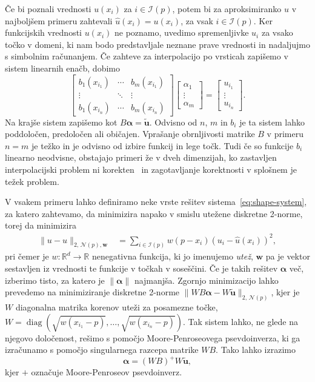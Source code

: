\documentclass[12pt,a4paper,twoside]{article}
\theoremstyle{definition} %
\theoremstyle{plain} %
\numberwithin{equation}{section}
\newcommand{\R}{\mathbb R}
\newcommand{\Nc}{\mathcal{N}}
\newcommand{\I}{\mathcal{I}}
\renewcommand{\b}{\boldsymbol}
\newcommand{\uh}{\hat{u}}
\DeclareMathOperator{\diag}{diag}
\begin{document}
Če bi poznali vrednosti $u(x_i)$ za $i \in \I(p)$, potem bi za aproksimiranko
$\uh$ v najboljšem primeru zahtevali  $\hat{u}(x_i) = u(x_i)$, za vsak $i \in \I(p)$.
Ker funkcijskih vrednosti $u(x_i)$ ne poznamo, uvedimo spremenljivke $u_i$ za vsako točko v domeni,
ki nam bodo predstavljale neznane prave vrednosti in nadaljujmo s simbolnim računanjem.
Če zahteve za interpolacijo po vrsticah zapišemo v sistem linearnih enačb, dobimo
\begin{equation}
\begin{bmatrix}
  b_1(x_{i_1}) & \cdots & b_m(x_{i_1}) \\
  \vdots & \ddots & \vdots   \\
  b_1(x_{i_n}) & \cdots & b_m(x_{i_n})
\end{bmatrix}
\begin{bmatrix}
  \alpha_1 \\ \vdots \\ \alpha_m
\end{bmatrix}
=
\begin{bmatrix}
  u_{i_1} \\ \vdots \\ u_{i_n}
\end{bmatrix}.
  \label{eq:shape-system}
\end{equation}
Na krajše sistem zapišemo kot $B\b{\alpha} = \b{\tilde{u}}$. Odvisno od $n$, $m$ in $b_i$ je ta
sistem lahko poddoločen, predoločen ali običajen. Vprašanje obrnljivosti matrike $B$ v primeru $n=m$
je težko in je odvisno od izbire funkcij in lege točk. Tudi če so funkcije $b_i$ linearno neodvisne,
obstajajo primeri že v dveh dimenzijah, ko zastavljen interpolacijski problem ni
korekten~\cite[str.\ 79, izrek 2.2]{kozak2008numericna} in zagotavljanje korektnosti v splošnem je
težek problem.

V vsakem primeru lahko definiramo neke vrste rešitev sistema~\eqref{eq:shape-system},
za katero zahtevamo, da minimizira napako v smislu utežene diskretne 2-norme, torej da minimizira
\begin{align}
  \|u-\uh\|_{2, \,\Nc(p), \b{w}} &= \sum_{i\in \I(p)} w(p-x_i) (u_i - \uh(x_i))^2,
\end{align}
pri čemer je $w\colon\R^d\to\R$ nenegativna funkcija, ki jo imenujemo \emph{utež}, $\b{w}$ pa je
vektor sestavljen iz vrednosti te funkcije v točkah v soseščini. Če je takih rešitev $\b \alpha$ več,
izberimo tisto, za katero je $\|\b\alpha\|$ najmanjša. Zgornjo minimizacijo lahko prevedemo na
minimiziranje diskretne 2-norme $\|WB\b{\alpha}-W\b{\tilde{u}}\|_{2, \,\Nc(p)}$, kjer je $W$ diagonalna
matrika korenov uteži za posamezne točke, $W = \diag(\sqrt{w(x_{i_1}-p)}, \dots,
\sqrt{w(x_{i_n}-p)})$. Tak sistem lahko, ne glede na njegovo določenost, rešimo s pomočjo
Moore-Penroseovega psevdoinverza, ki ga izračunamo s pomočjo singularnega razcepa matrike $WB$.
Tako lahko izrazimo \[ \b{\alpha} = (WB)^{+}W\b{\tilde u}, \]
kjer $+$ označuje Moore-Penroseov psevdoinverz.
\end{document}

